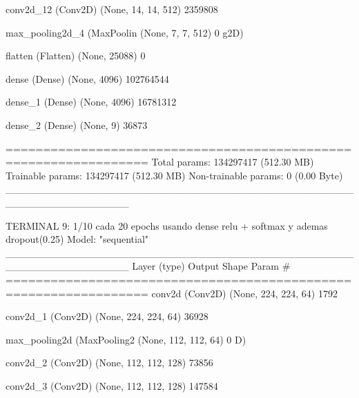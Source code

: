\documentclass[11pt, a4paper]{article} %
\begin{document}
 conv2d_12 (Conv2D)          (None, 14, 14, 512)       2359808   
                                                                 
 max_pooling2d_4 (MaxPoolin  (None, 7, 7, 512)         0         
 g2D)                                                            
                                                                 
 flatten (Flatten)           (None, 25088)             0         
                                                                 
 dense (Dense)               (None, 4096)              102764544 
                                                                 
 dense_1 (Dense)             (None, 4096)              16781312  
                                                                 
 dense_2 (Dense)             (None, 9)                 36873     
                                                                 
=================================================================
Total params: 134297417 (512.30 MB)
Trainable params: 134297417 (512.30 MB)
Non-trainable params: 0 (0.00 Byte)
_________________________________________________________________



TERMINAL 9: 1/10 cada 20 epochs usando dense relu + softmax y ademas dropout(0.25)
Model: "sequential"
_________________________________________________________________
 Layer (type)                Output Shape              Param #   
=================================================================
 conv2d (Conv2D)             (None, 224, 224, 64)      1792      
                                                                 
 conv2d_1 (Conv2D)           (None, 224, 224, 64)      36928     
                                                                 
 max_pooling2d (MaxPooling2  (None, 112, 112, 64)      0         
 D)                                                              
                                                                 
 conv2d_2 (Conv2D)           (None, 112, 112, 128)     73856     
                                                                 
 conv2d_3 (Conv2D)           (None, 112, 112, 128)     147584    
                                                                 
\end{document}
